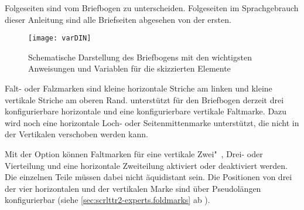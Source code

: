 Folgeseiten sind vom Briefbogen zu
unterscheiden. Folgeseiten im Sprachgebrauch dieser Anleitung sind alle
Briefseiten abgesehen von der ersten.


\begin{figure}
  \centering
  \texttt{[image: varDIN]}
  \caption{Schematische Darstellung des Briefbogens mit den wichtigsten
    Anweisungen und Variablen für die skizzierten Elemente}
  \label{fig:\LabelBase.variables}
\end{figure}


\begin{Declaration}
\end{Declaration}
Falt- oder Falzmarken sind kleine
horizontale Striche am linken und kleine vertikale Striche am oberen
Rand. \KOMAScript{} unterstützt für den Briefbogen derzeit drei
konfigurierbare horizontale und eine konfigurierbare vertikale Faltmarke. Dazu
wird noch eine horizontale Loch- oder Seitenmittenmarke unterstützt, die nicht
in der Vertikalen verschoben werden kann.

Mit der Option  können Faltmarken für eine
vertikale Zwei"~, Drei- oder Vierteilung und eine horizontale Zweiteilung
aktiviert oder deaktiviert werden. Die einzelnen Teile müssen dabei nicht
äquidistant sein. Die Positionen von drei der vier horizontalen und der
vertikalen Marke sind über Pseudolängen konfigurierbar (siehe
\autoref{sec:scrlttr2-experts.foldmarks} ab
).

